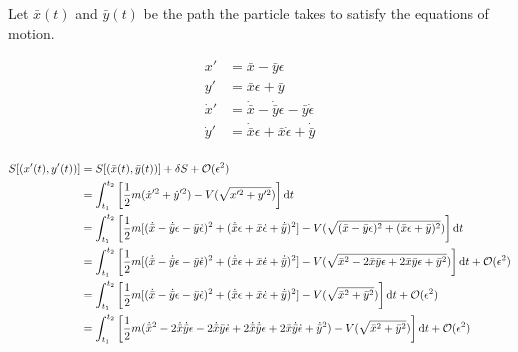 \documentclass{article}
\begin{document}
Let $\bar{x}(t)$ and $\bar{y}(t)$ be the path the particle takes to satisfy the equations of motion.

\begin{align*}
    x'       & = \bar{x}-\bar{y}\epsilon                                    \\
    y'       & = \bar{x}\epsilon+\bar{y}                                    \\
    \dot{x}' & = \dot{\bar{x}}-\dot{\bar{y}}\epsilon -\bar{y}\dot{\epsilon} \\
    \dot{y}' & = \dot{\bar{x}}\epsilon+\bar{x}\dot{\epsilon}+\dot{\bar{y}}  \\
\end{align*}

\begin{align*}
    S[(x'(t),y'(t))] & =S[(\bar{x}(t),\bar{y}(t))]+\var{S}+
    \mathcal{O}(\epsilon^2)                                                                                                                                                                                                                                                                               \\
                     & =\int_{t_1}^{t_2}\bqty{\frac{1}{2}m(\dot{x}'^2+\dot{y}'^2)-V(\sqrt{x'^2+y'^2})}\dd{t}                                                                                                                                                                                              \\
                     & =\int_{t_1}^{t_2}\bqty{\frac{1}{2}m[(\dot{\bar{x}}-\dot{\bar{y}}\epsilon -\bar{y}\dot{\epsilon})^2+(\dot{\bar{x}}\epsilon+\bar{x}\dot{\epsilon}+\dot{\bar{y}})^2]-V(\sqrt{(\bar{x}-\bar{y}\epsilon)^2+(\bar{x}\epsilon+\bar{y})^2})}\dd{t}                                         \\
                     & =\int_{t_1}^{t_2}\bqty{\frac{1}{2}m[(\dot{\bar{x}}-\dot{\bar{y}}\epsilon -\bar{y}\dot{\epsilon})^2+(\dot{\bar{x}}\epsilon+\bar{x}\dot{\epsilon}+\dot{\bar{y}})^2]-V(\sqrt{\bar{x}^2-2\bar{x}\bar{y}\epsilon+2\bar{x}\bar{y}\epsilon+\bar{y}^2})}\dd{t}+\mathcal{O}(\epsilon^2)     \\
                     & =\int_{t_1}^{t_2}\bqty{\frac{1}{2}m[(\dot{\bar{x}}-\dot{\bar{y}}\epsilon -\bar{y}\dot{\epsilon})^2+(\dot{\bar{x}}\epsilon+\bar{x}\dot{\epsilon}+\dot{\bar{y}})^2]-V(\sqrt{\bar{x}^2+\bar{y}^2})}\dd{t}+\mathcal{O}(\epsilon^2)                                                     \\
                     & =\int_{t_1}^{t_2}\bqty{\frac{1}{2}m(\dot{\bar{x}}^2-2\dot{\bar{x}}\dot{\bar{y}}\epsilon -2\dot{\bar{x}}\bar{y}\dot{\epsilon}+2\dot{\bar{x}}\dot{\bar{y}}\epsilon+2\bar{x}\dot{\bar{y}}\dot{\epsilon}+\dot{\bar{y}}^2)-V(\sqrt{\bar{x}^2+\bar{y}^2})}\dd{t}+\mathcal{O}(\epsilon^2) \\

\end{align*}
\end{document}
